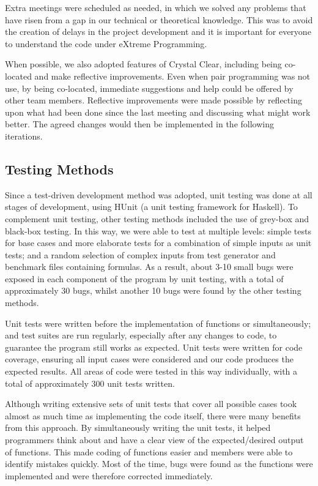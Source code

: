 Extra meetings were scheduled as needed, in which we solved any problems that have risen from a gap in our technical or theoretical knowledge. This was to avoid the creation of delays in the project development and it is important for everyone to understand the code under eXtreme Programming.

When possible, we also adopted features of Crystal Clear, including being co-located and make reflective improvements. Even when pair programming was not use, by being co-located, immediate suggestions and help could be offered by other team members. Reflective improvements were made possible by reflecting upon what had been done since the last meeting and discussing what might work better. The agreed changes would then be implemented in the following iterations.

\subsection*{Testing Methods}

Since a test-driven development method was adopted, unit testing was done at all stages of development, using HUnit (a unit testing framework for Haskell). To complement unit testing, other testing methods included the use of grey-box and black-box testing. In this way, we were able to test at multiple levels: simple tests for base cases and more elaborate tests for a combination of simple inputs as unit tests; and a random selection of complex inputs from test generator and benchmark files containing formulas. As a result, about 3-10 small bugs were exposed in each component of the program by unit testing, with a total of approximately 30 bugs, whilst another 10 bugs were found by the other testing methods.

Unit tests were written before the implementation of functions or simultaneously; and test suites are run regularly, especially after any changes to code, to guarantee the program still works as expected. Unit tests were written for code coverage, ensuring all input cases were considered and our code produces the expected results. All areas of code were tested in this way individually, with a total of approximately 300 unit tests written.

Although writing extensive sets of unit tests that cover all possible cases took almost as much time as implementing the code itself, there were many benefits from this approach. By simultaneously writing the unit tests, it helped programmers think about and have a clear view of the expected/desired output of functions. This made coding of functions easier and members were able to identify mistakes quickly. Most of the time, bugs were found as the functions were implemented and were therefore corrected immediately.

